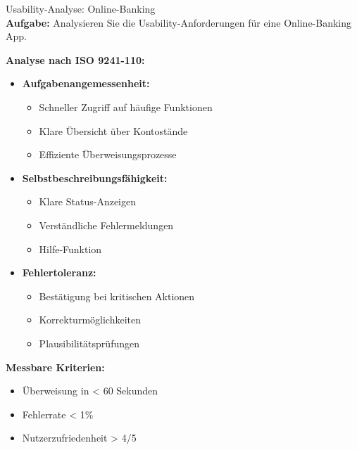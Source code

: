 \begin{example2}{Usability-Analyse: Online-Banking}\\
\textbf{Aufgabe:} Analysieren Sie die Usability-Anforderungen für eine Online-Banking App.

\textbf{Analyse nach ISO 9241-110:}
\begin{itemize}
    \item \textbf{Aufgabenangemessenheit:}
    \begin{itemize}
        \item Schneller Zugriff auf häufige Funktionen
        \item Klare Übersicht über Kontostände
        \item Effiziente Überweisungsprozesse
    \end{itemize}
    
    \item \textbf{Selbstbeschreibungsfähigkeit:}
    \begin{itemize}
        \item Klare Status-Anzeigen
        \item Verständliche Fehlermeldungen
        \item Hilfe-Funktion
    \end{itemize}
    
    \item \textbf{Fehlertoleranz:}
    \begin{itemize}
        \item Bestätigung bei kritischen Aktionen
        \item Korrekturmöglichkeiten
        \item Plausibilitätsprüfungen
    \end{itemize}
\end{itemize}

\textbf{Messbare Kriterien:}
\begin{itemize}
    \item Überweisung in < 60 Sekunden
    \item Fehlerrate < 1\%
    \item Nutzerzufriedenheit > 4/5
\end{itemize}
\end{example2}